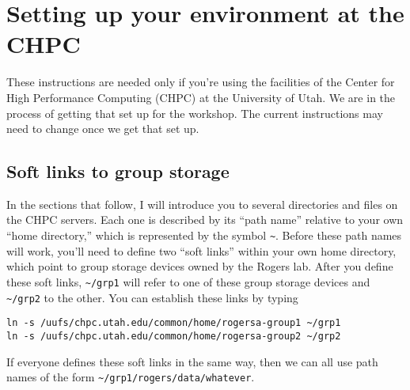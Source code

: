 \documentclass[11pt]{article}
\begin{document}
\section{Setting up your environment at the CHPC}
\label{sec.chpc}
These instructions are needed only if you're using the facilities of
the Center for High Performance Computing (CHPC) at the University of
Utah. We are in the process of getting that set up for the
workshop. The current instructions may need to change once we get that
set up.

\subsection{Soft links to group storage}
In the sections that follow, I will introduce you to several
directories and files on the CHPC servers. Each one is described by
its ``path name'' relative to your own ``home directory,'' which is
represented by the symbol \verb|~|. Before these path names will work,
you'll need to define two ``soft links'' within your own home
directory, which point to group storage devices owned by the Rogers
lab. After you define these soft links, \verb|~/grp1| will refer to
one of these group storage devices and \verb|~/grp2| to the other. You
can establish these links by typing
\begin{verbatim}
ln -s /uufs/chpc.utah.edu/common/home/rogersa-group1 ~/grp1
ln -s /uufs/chpc.utah.edu/common/home/rogersa-group2 ~/grp2
\end{verbatim}
If everyone defines these soft links in the same way, then we can all
use path names of the form \verb|~/grp1/rogers/data/whatever|.
\end{document}
